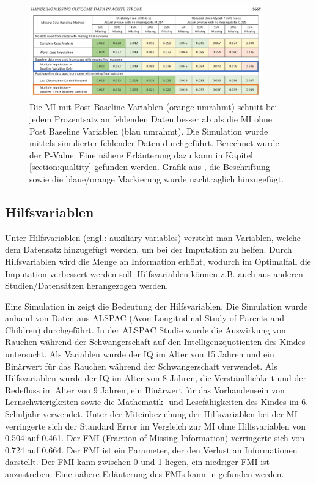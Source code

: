   \begin{figure}[t]
	\centering
	\includegraphics[width=0.9\textwidth]{images/grafik_saver.png}
	\caption{
		Die MI mit Post-Baseline Variablen (orange umrahmt) schnitt bei jedem Prozentsatz an fehlenden Daten besser ab als 
		die MI ohne Post Baseline Variablen (blau umrahmt). Die Simulation wurde mittels simulierter fehlender Daten durchgeführt. Berechnet wurde der P-Value.
		Eine nähere Erläuterung dazu kann in Kapitel \ref{section:qualtity} gefunden werden. 
		Grafik aus \textcite[3667]{Young-Saver2018}, die Beschriftung sowie die blaue/orange Markierung wurde nachträglich 
		hinzugefügt.
	}
	\label{figure:study}
\end{figure}

\subsection{Hilfsvariablen}

Unter Hilfsvariablen (engl.: auxiliary variables) versteht man Variablen, welche dem Datensatz hinzugefügt werden, um bei der Imputation zu helfen. \autocite[211]{Graham2007}
Durch Hilfsvariablen wird die Menge an Information erhöht, wodurch im Optimalfall die Imputation verbessert werden soll.
Hilfsvariablen können z.B. auch aus anderen Studien/Datensätzen herangezogen werden.

Eine Simulation in \textcite[]{Madley-Dowd2019} zeigt die Bedeutung der Hilfsvariablen. 
Die Simulation wurde anhand von Daten aus ALSPAC (Avon Longitudinal Study of Parents and Children) 
durchgeführt. In der ALSPAC Studie wurde die Auswirkung von Rauchen während der Schwangerschaft auf den Intelligenzquotienten des Kindes untersucht. Als Variablen wurde
der IQ im Alter von 15 Jahren und ein Binärwert für das Rauchen während der Schwangerschaft verwendet. Als Hilfsvariablen wurde der IQ im Alter von 8 Jahren, die Verständlichkeit 
und der Redefluss im Alter von 9 Jahren, ein Binärwert für das Vorhandensein von Lernschwierigkeiten sowie die Mathematik- und Lesefähigkeiten des Kindes im 6. Schuljahr verwendet. 
Unter der Miteinbeziehung der Hilfsvariablen bei der MI verringerte sich der Standard Error im Vergleich zur MI ohne Hilfsvariablen von 0.504 auf 0.461. Der FMI (Fraction of Missing Information)
verringerte sich von 0.724 auf 0.664. \autocite[71]{Madley-Dowd2019} Der FMI ist ein Parameter, der den Verlust an Informationen darstellt. Der FMI kann zwischen 0 und 1 liegen, 
ein niedriger FMI ist anzustreben.
\autocite[65]{Madley-Dowd2019} Eine nähere Erläuterung des FMIs kann in \textcite[]{Madley-Dowd2019} gefunden werden. 



